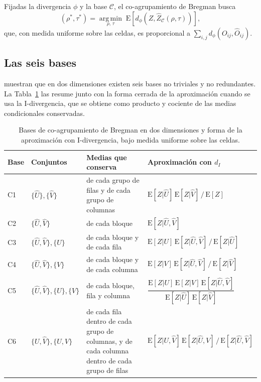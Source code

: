 Fijadas la divergencia $\phi$ y la base $\mathcal{C}$, el co-agrupamiento de
Bregman busca
\begin{equation}\label{eq:objetivo-bregman}
  (\rho^*, \tau^*) = \operatorname*{arg\,min}_{\rho,\, \tau}\;
  \mathrm{E}\!\left[ d_\phi\!\left(Z, \hat{Z}_{\mathcal{C}}(\rho, \tau)\right) \right],
\end{equation}
que, con medida uniforme sobre las celdas, es proporcional a
$\sum_{i,j} d_\phi(O_{ij}, \hat{O}_{ij})$.

\subsection{Las seis bases}\label{sec:bases}

\cite[Teorema~3]{Banerjee2007} muestran que en dos dimensiones existen seis bases
no triviales y no redundantes. La Tabla~\ref{tab:bases} las resume junto con la
forma cerrada de la aproximación cuando se usa la I-divergencia, que se obtiene
como producto y cociente de las medias condicionales conservadas.

\begin{table}[ht]
  \centering
  {\footnotesize
  \begin{tabular}{@{}l p{} p{} p{}@{}}
    \toprule
    \textbf{Base} & \textbf{Conjuntos} & \textbf{Medias que conserva} & \textbf{Aproximación con $d_I$} \\
    \midrule
    C1 & $\{\hat{U}\}, \{\hat{V}\}$ & de cada grupo de filas y de cada grupo de columnas &
      $\mathrm{E}[Z|\hat{U}]\,\mathrm{E}[Z|\hat{V}] \,/\, \mathrm{E}[Z]$ \\
    C2 & $\{\hat{U}, \hat{V}\}$ & de cada bloque &
      $\mathrm{E}[Z|\hat{U},\hat{V}]$ \\
    C3 & $\{\hat{U}, \hat{V}\}, \{U\}$ & de cada bloque y de cada fila &
      $\mathrm{E}[Z|U]\,\mathrm{E}[Z|\hat{U},\hat{V}] \,/\, \mathrm{E}[Z|\hat{U}]$ \\
    C4 & $\{\hat{U}, \hat{V}\}, \{V\}$ & de cada bloque y de cada columna &
      $\mathrm{E}[Z|V]\,\mathrm{E}[Z|\hat{U},\hat{V}] \,/\, \mathrm{E}[Z|\hat{V}]$ \\
    C5 & $\{\hat{U}, \hat{V}\}, \{U\}, \{V\}$ & de cada bloque, fila y columna &
      $\dfrac{\mathrm{E}[Z|U]\,\mathrm{E}[Z|V]\,\mathrm{E}[Z|\hat{U},\hat{V}]}{\mathrm{E}[Z|\hat{U}]\,\mathrm{E}[Z|\hat{V}]}$ \\
    C6 & $\{U, \hat{V}\}, \{\hat{U}, V\}$ & de cada fila dentro de cada grupo de columnas, y de cada columna dentro de cada grupo de filas &
      $\mathrm{E}[Z|U,\hat{V}]\,\mathrm{E}[Z|\hat{U},V] \,/\, \mathrm{E}[Z|\hat{U},\hat{V}]$ \\
    \bottomrule
  \end{tabular}
  }
  \caption{Bases de co-agrupamiento de Bregman en dos dimensiones
  \cite{Banerjee2007} y forma de la aproximación con I-divergencia, bajo medida
  uniforme sobre las celdas.}
  \label{tab:bases}
\end{table}

